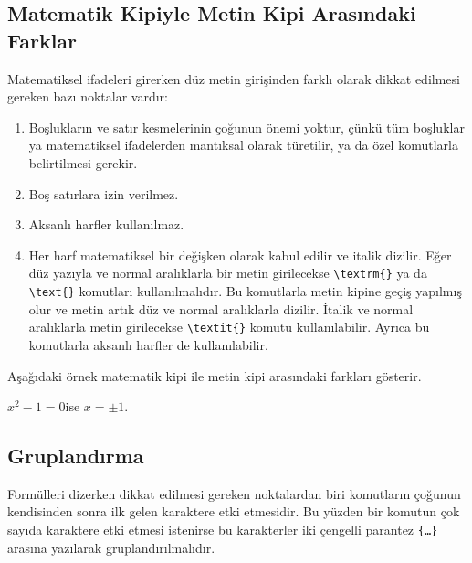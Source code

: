 \documentclass[
  10pt,
]{scrbook}
\newenvironment{Shaded}{}{}
\newcommand{\NormalTok}[1]{#1}
\newcommand{\SpecialCharTok}[1]{\textcolor[rgb]{0.25,0.44,0.63}{#1}}
\newcommand{\SpecialStringTok}[1]{\textcolor[rgb]{0.73,0.40,0.53}{#1}}
\providecommand{\tightlist}{%
  \setlength{\itemsep}{0pt}\setlength{\parskip}{0pt}}
\theoremstyle{definition}
\theoremstyle{definition}
\theoremstyle{definition}
\theoremstyle{definition}
\theoremstyle{remark}
\begin{document}
\hypertarget{matematik-kipiyle-metin-kipi-arasux131ndaki-farklar}{%
\subsection{Matematik Kipiyle Metin Kipi Arasındaki Farklar}\label{matematik-kipiyle-metin-kipi-arasux131ndaki-farklar}}

Matematiksel ifadeleri girerken düz metin girişinden farklı olarak dikkat edilmesi gereken bazı noktalar vardır:

\begin{enumerate}
\def\labelenumi{\arabic{enumi}.}
\tightlist
\item
  Boşlukların ve satır kesmelerinin çoğunun önemi yoktur, çünkü tüm boşluklar ya matematiksel ifadelerden mantıksal olarak türetilir, ya da özel komutlarla belirtilmesi gerekir.
\item
  Boş satırlara izin verilmez.
\item
  Aksanlı harfler kullanılmaz.
\item
  Her harf matematiksel bir değişken olarak kabul edilir ve italik dizilir. Eğer düz yazıyla ve normal aralıklarla bir metin girilecekse \texttt{\textbackslash{}textrm\{\}} ya da \texttt{\textbackslash{}text\{\}} komutları kullanılmalıdır. Bu komutlarla metin kipine geçiş yapılmış olur ve metin artık düz ve normal aralıklarla dizilir. İtalik ve normal aralıklarla metin girilecekse \texttt{\textbackslash{}textit\{\}} komutu kullanılabilir. Ayrıca bu komutlarla aksanlı harfler de kullanılabilir.
\end{enumerate}

Aşağıdaki örnek matematik kipi ile metin kipi arasındaki farkları gösterir.

\begin{Shaded}
\end{Shaded}

\(x^2-1=0 \text{ise $x=\pm 1$}.\)

\hypertarget{gruplandux131rma}{%
\subsection{Gruplandırma}\label{gruplandux131rma}}

Formülleri dizerken dikkat edilmesi gereken noktalardan biri komutların çoğunun kendisinden sonra ilk gelen karaktere etki etmesidir. Bu yüzden bir komutun çok sayıda karaktere etki etmesi istenirse bu karakterler iki çengelli parantez \texttt{\{…\}} arasına yazılarak gruplandırılmalıdır.
\end{document}
